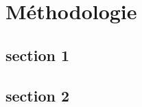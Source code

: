 \chapter{Méthodologie}
\lipsum  %


\section{section 1}

\lipsum  %


\section{section 2}

\lipsum  %

